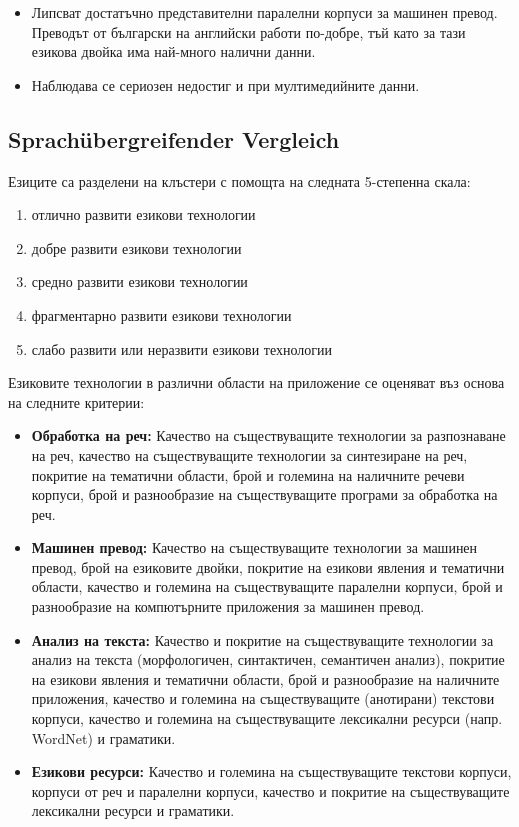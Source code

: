 \documentclass[]{../../metanetpaper}
\begin{document}
\begin{multicols}{2}
\begin{itemize}
\item Липсват достатъчно представителни паралелни корпуси за машинен
  превод. Преводът от български на английски работи по-добре, тъй като
  за тази езикова двойка има най-много налични данни.

\item Наблюдава се сериозен недостиг и при мултимедийните данни.
\end{itemize}

\subsection{Sprachübergreifender Vergleich}

Езиците са разделени на клъстери с помощта на следната 5-степенна скала:

\begin{enumerate}
\item отлично развити езикови технологии
\item добре развити езикови технологии
\item средно развити езикови технологии
\item фрагментарно развити езикови технологии
\item слабо развити или неразвити езикови технологии
\end{enumerate}

Езиковите технологии в различни области на приложение се оценяват въз
основа на следните критерии:

\begin{itemize}
\item \textbf{Обработка на реч:} Качество на съществуващите технологии
  за разпознаване на реч, качество на съществуващите технологии за
  синтезиране на реч, покритие на тематични области, брой и големина
  на наличните речеви корпуси, брой и разнообразие на съществуващите
  програми за обработка на реч.
\item \textbf{Машинен превод:} Качество на съществуващите технологии
  за машинен превод, брой на езиковите двойки, покритие на езикови
  явления и тематични области, качество и големина на съществуващите
  паралелни корпуси, брой и разнообразие на компютърните приложения за
  машинен превод.
\item \textbf{Анализ на текста:} Качество и покритие на съществуващите
  технологии за анализ на текста (морфологичен, синтактичен,
  семантичен анализ), покритие на езикови явления и тематични области,
  брой и разнообразие на наличните приложения, качество и големина на
  съществуващите (анотирани) текстови корпуси, качество и големина на
  съществуващите лексикални ресурси (напр. WordNet) и граматики.
\item \textbf{Езикови ресурси:} Качество и големина на съществуващите
  текстови корпуси, корпуси от реч и паралелни корпуси, качество и
  покритие на съществуващите лексикални ресурси и граматики.
\end{itemize} 


\end{multicols}
\end{document}
